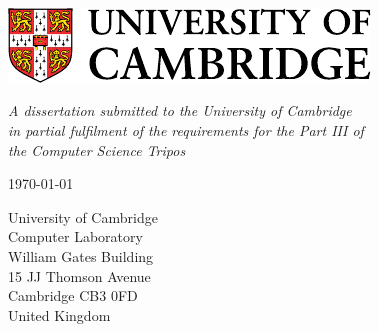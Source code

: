 \begin{titlepage} 

\begin{center}
\noindent
\huge
\dissertationtitle \\
\end{center}

\begin{center}
\noindent
\huge
\authorname \\
\Large
\authorcollege      \\[24pt]
\includegraphics{CUni3.pdf}
\end{center}

\vspace{24pt} 

\begin{center}
\noindent
\large
{\it A dissertation submitted to the University of Cambridge \\ 
in partial 	fulfilment of the requirements for the Part III of \\ 
the Computer Science Tripos} 
\end{center}

\begin{center}
\noindent
\Large \today
\end{center}



\begin{center}
\noindent
University of Cambridge \\
Computer Laboratory     \\
William Gates Building  \\
15 JJ Thomson Avenue    \\
Cambridge CB3 0FD       \\
{\sc United Kingdom}    \\
\end{center}





\end{titlepage} 

\newpage
\vspace*{\fill}

